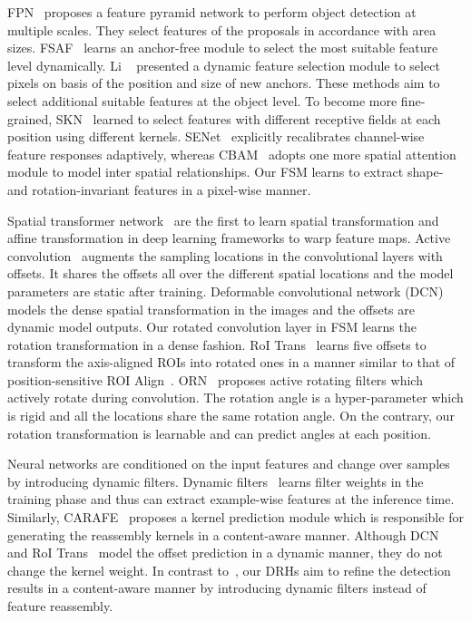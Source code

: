 \documentclass[10pt,twocolumn,letterpaper]{article}
\newcommand{\nothing}[1]{}
\renewcommand{\nothing}[1]{}
\begin{document}
FPN~\cite{lin2017feature} proposes a feature pyramid network to perform object detection at multiple scales. They select features of the proposals in accordance with area sizes.
FSAF~\cite{zhu2019feature} learns an anchor-free module to select the most suitable feature level dynamically.
Li \etal~\cite{li2019dynamic} presented a dynamic feature selection module to select pixels on basis of the position and size of new anchors.
These methods aim to select additional suitable features at the object level.
To become more fine-grained, SKN~\cite{li2019selective} learned to select features with different receptive fields at each position using different kernels.
SENet~\cite{hu2018squeeze} explicitly recalibrates channel-wise feature responses adaptively, whereas CBAM~\cite{woo2018cbam} adopts one more spatial attention module to model inter spatial relationships.
Our FSM learns to extract shape- and rotation-invariant features in a pixel-wise manner.

Spatial transformer network~\cite{jaderberg2015spatial} are the first to learn spatial transformation and affine transformation in deep learning frameworks to warp feature maps.\nothing{, which is known difficult to learning}
Active convolution~\cite{jeon2017active} augments the sampling locations in the convolutional layers with offsets. It shares the offsets all over the different spatial locations and the model parameters are static after training.
Deformable convolutional network (DCN)~\cite{dai2017deformable} models the dense spatial transformation in the images and the offsets are dynamic model outputs.
Our rotated convolution layer in FSM learns the rotation transformation in a dense fashion\nothing{ and it is also lightweight and dynamic}.
RoI Trans~\cite{ding2019learning} learns five offsets to transform the axis-aligned ROIs into rotated ones in a manner similar to that of position-sensitive ROI Align~\cite{ren2015faster}.
ORN~\cite{zhou2017oriented} proposes active rotating filters which actively rotate during convolution. The rotation angle is a hyper-parameter which is rigid and all the locations share the same rotation angle.
On the contrary, our rotation transformation is learnable and can predict angles at each position.

Neural networks are conditioned on the input features and change over samples by introducing dynamic filters.
Dynamic filters~\cite{jia2016dynamic} learns filter weights in the training phase and thus can extract example-wise features at the inference time.
Similarly, CARAFE~\cite{wang2019carafe} proposes a kernel prediction module which is responsible for generating the reassembly kernels in a content-aware manner.
Although DCN~\cite{dai2017deformable} and RoI Trans~\cite{ding2019learning} model the offset prediction in a dynamic manner, they do not change the kernel weight.
In contrast to~\cite{dai2017deformable,wang2019carafe}, our DRHs aim to refine the detection results in a content-aware manner by introducing dynamic filters instead of feature reassembly.
\end{document}

